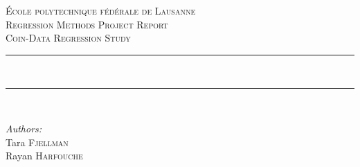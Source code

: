 \begin{titlepage}
    \newcommand{\HRule}{\rule{\linewidth}{0.5mm}} %
    
    \center  %
     

    \vspace{3cm}
    \textsc{\LARGE École polytechnique fédérale de Lausanne}\\[1.5cm] %
    
    \textsc{\Large Regression Methods Project Report}\\[0.5cm] %
    \textsc{\large Coin-Data Regression Study}\\[0.5cm] %
    
    
    \HRule \\[0.4cm] %
    
    
    
    \HRule \\[1.5cm]
     
    
    \begin{minipage}{0.4\textwidth}
    \begin{flushleft} \large
    
    \emph{Authors:}\\
    Tara \textsc{Fjellman}\\
    Rayan \textsc{Harfouche}\\
    
    
    
    
    \end{flushleft}
    \end{minipage}
    ~
    \begin{minipage}{0.4\textwidth}
    \begin{flushright} \large
    

\end{flushright}
\end{minipage}
\end{titlepage}
